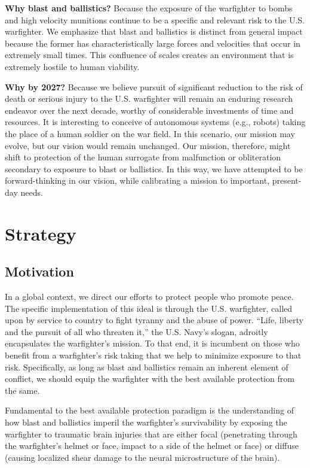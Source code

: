 \documentclass[12pt,reqno]{amsart}
\begin{document}
{\bf Why blast and ballistics?}  Because the 
exposure of the warfighter to bombs and high velocity munitions continue 
to be a specific and relevant risk to the U.S. warfighter.  We emphasize 
that blast and ballistics is distinct from general impact because the 
former has characteristically large forces and velocities that occur  
in extremely small times.  
This confluence of scales creates an  
environment that is extremely hostile to human viability.  

{\bf Why by 2027?}  Because we believe pursuit of significant reduction to 
the risk of death or serious injury to the U.S. warfighter will remain an 
enduring research endeavor over the next decade, worthy of considerable 
investments of time and resources.  It is interesting to conceive of 
autonomous systems (e.g., robots) taking the place of a human soldier on 
the war field.  In this scenario, our mission may evolve, but our vision 
would remain unchanged.  Our mission, therefore, might shift to protection 
of the human surrogate from malfunction or obliteration secondary to exposure 
to blast or ballistics.  In this way, we have attempted to be forward-thinking 
in our vision, while calibrating a mission to important, present-day needs.  

\section{Strategy}
\subsection{Motivation}
In a global context, we direct our efforts to protect people who promote 
peace.  The specific implementation of this ideal is through the 
U.S. warfighter, called upon by service to country to fight tyranny and 
the abuse of power.  ``Life, liberty and the pursuit of all who threaten it,''
the U.S. Navy's slogan, adroitly encapsulates the warfighter's mission.
To that end, it is incumbent on those who benefit from a warfighter's risk 
taking that we help to minimize exposure to that risk.  Specifically, as long 
as blast and ballistics remain an inherent element of conflict, we 
should equip the warfighter with the best available protection from the same.  

Fundamental to the best available protection paradigm is the understanding 
of how blast and ballistics imperil the warfighter's survivability by 
exposing the warfighter to traumatic brain injuries that are either focal 
(penetrating through the warfighter's helmet or face, impact to a side of 
the helmet or face) or diffuse (causing localized shear damage to the 
neural microstructure of the brain).  
\end{document}
